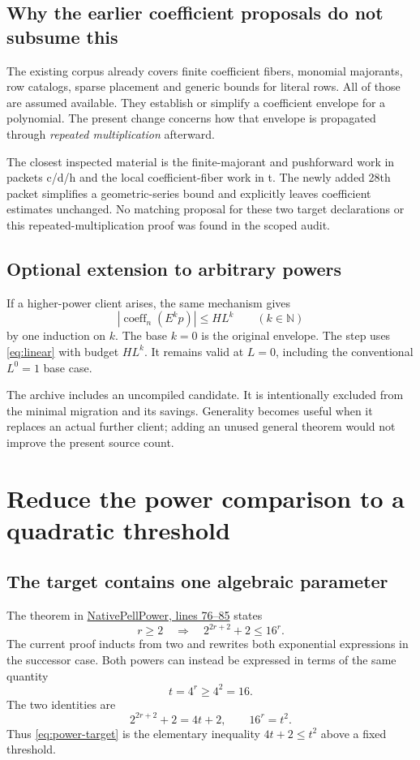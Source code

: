 \documentclass[11pt,letterpaper]{article}
\newcommand{\code}[1]{\texttt{\small\detokenize{#1}}}
\newcommand{\src}[3]{\href{https://github.com/VladimirReshetnikov/ProveIt/blob/89226e3921bce3e8949fadd12d3efb6914c7630c/Computability/DiophantineConsistency/Lean/DiophantineConsistency/#1.lean\#L#2-L#3}{\textsf{#1}, lines #2--#3}}
\newcommand{\N}{\mathbb{N}}
\newcommand{\coeff}{\operatorname{coeff}}
\begin{document}
\subsection{Why the earlier coefficient proposals do not subsume this}

The existing corpus already covers finite coefficient fibers, monomial majorants, row catalogs, sparse placement and generic bounds for literal rows. All of those are assumed available. They establish or simplify a coefficient envelope for a polynomial. The present change concerns how that envelope is propagated through \emph{repeated multiplication} afterward.

The closest inspected material is the finite-majorant and pushforward work in packets c/d/h and the local coefficient-fiber work in t. The newly added 28th packet simplifies a geometric-series bound and explicitly leaves coefficient estimates unchanged. No matching proposal for these two target declarations or this repeated-multiplication proof was found in the scoped audit.

\subsection{Optional extension to arbitrary powers}

If a higher-power client arises, the same mechanism gives
\[
  |\coeff_n(E^kp)|\le HL^k\qquad(k\in\N)
\]
by one induction on $k$. The base $k=0$ is the original envelope. The step uses \eqref{eq:linear} with budget $HL^k$. It remains valid at $L=0$, including the conventional $L^0=1$ base case.

The archive includes an uncompiled \code{ConvolutionPowers.lean} candidate. It is intentionally excluded from the minimal migration and its savings. Generality becomes useful when it replaces an actual further client; adding an unused general theorem would not improve the present source count.

\section{Reduce the power comparison to a quadratic threshold}
\label{sec:powers}

\subsection{The target contains one algebraic parameter}

The theorem \code{sixteen_pow_bound} in \src{NativePellPower}{76}{85} states
\begin{equation}
  r\ge2\quad\Longrightarrow\quad 2^{2r+2}+2\le16^r.
  \label{eq:power-target}
\end{equation}
The current proof inducts from two and rewrites both exponential expressions in the successor case. Both powers can instead be expressed in terms of the same quantity
\[
  t=4^r\ge4^2=16.
\]
The two identities are
\[
  2^{2r+2}+2=4t+2,
  \qquad 16^r=t^2.
\]
Thus \eqref{eq:power-target} is the elementary inequality $4t+2\le t^2$ above a fixed threshold.
\end{document}
